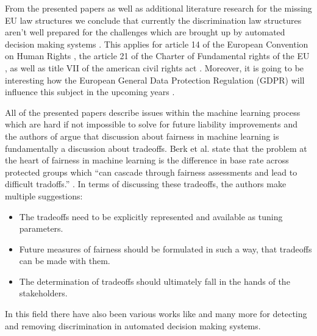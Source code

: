 From the presented papers as well as additional literature research for the missing EU law structures we conclude that currently the discrimination law structures aren't well prepared for the challenges which are brought up by automated decision making systems \cite{Barocas.2016, barocas-hardt-narayanan, automatedDsicrimination}. This applies for article 14 of the European Convention on Human Rights \cite{EU14}, the article 21 of the Charter of Fundamental rights of the EU \cite{EU21}, as well as title VII \cite{titleVII} of the american civil rights act  \cite{Barocas.2016, automatedDsicrimination}. Moreover, it is going to be interesting how the European General Data Protection Regulation (GDPR) will influence this subject in the upcoming years \cite{automatedDsicrimination, Singh}.

All of the presented papers describe issues within the machine learning process which are hard if not impossible to solve for future liability improvements and the authors of \cite{ Barocas.2016, Berk.2018} argue that discussion about fairness in machine learning is fundamentally a discussion about tradeoffs. Berk et al. state that the problem at the heart of fairness in machine learning is the difference
in base rate across protected groups which \enquote{can cascade through fairness assessments
and lead to difficult tradoffs.} \cite{Berk.2018}. In terms of discussing these tradeoffs, the authors make multiple
suggestions:
\begin{itemize}
    \item The tradeoffs need to be explicitly represented and available as tuning parameters.
    \item Future measures of fairness should be formulated in such a way, that tradeoffs can
    be made with them.
    \item The determination of tradeoffs should ultimately fall in the hands of the stakeholders.
\end{itemize}
In this field there have also been various works like \cite{DBLP:conf/kdd/FeldmanFMSV15, isabel02, isabel01} and many more for detecting and removing discrimination in automated decision making systems. 